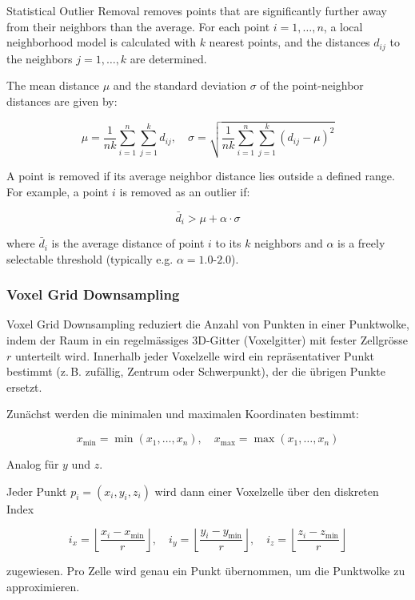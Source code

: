 \begin{English}
    Statistical Outlier Removal removes points that are significantly further away from their neighbors than the average.  
    For each point $i = 1, \dots, n$, a local neighborhood model is calculated with $k$ nearest points, and the distances $d_{ij}$ to the neighbors $j = 1, \dots, k$ are determined.

    The mean distance $\mu$ and the standard deviation $\sigma$ of the point-neighbor distances are given by:

    \[
    \mu = \frac{1}{nk} \sum_{i=1}^{n} \sum_{j=1}^{k} d_{ij}, \quad
    \sigma = \sqrt{ \frac{1}{nk} \sum_{i=1}^{n} \sum_{j=1}^{k} (d_{ij} - \mu)^2 }
    \]

    A point is removed if its average neighbor distance lies outside a defined range.  
    For example, a point $i$ is removed as an outlier if:

    \[
    \bar{d}_i > \mu + \alpha \cdot \sigma
    \]

    where $\bar{d}_i$ is the average distance of point $i$ to its $k$ neighbors and $\alpha$ is a freely selectable threshold (typically e.g. $\alpha = 1.0\text{-}2.0$). \cite{liu3DPointCloud2021}
\end{English}





\subsubsection{Voxel Grid Downsampling}
\begin{German}
    Voxel Grid Downsampling reduziert die Anzahl von Punkten in einer Punktwolke, indem der Raum in ein regelmässiges 3D-Gitter (Voxelgitter) mit fester Zellgrösse $r$ unterteilt wird. Innerhalb jeder Voxelzelle wird ein repräsentativer Punkt bestimmt (z.\,B. zufällig, Zentrum oder Schwerpunkt), der die übrigen Punkte ersetzt.

    Zunächst werden die minimalen und maximalen Koordinaten bestimmt:

    \[
    x_{\min} = \min(x_1, \dots, x_n), \quad x_{\max} = \max(x_1, \dots, x_n)
    \]

    Analog für $y$ und $z$.

    Jeder Punkt $p_i = (x_i, y_i, z_i)$ wird dann einer Voxelzelle über den diskreten Index

    \[
    i_x = \left\lfloor \frac{x_i - x_{\min}}{r} \right\rfloor, \quad
    i_y = \left\lfloor \frac{y_i - y_{\min}}{r} \right\rfloor, \quad
    i_z = \left\lfloor \frac{z_i - z_{\min}}{r} \right\rfloor
    \]

    zugewiesen. Pro Zelle wird genau ein Punkt übernommen, um die Punktwolke zu approximieren.
\end{German}

